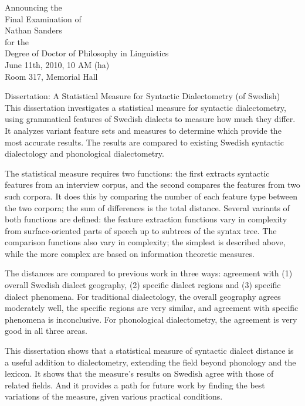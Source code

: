 \documentclass[11pt]{article}
\begin{document}
\begin{center}
Announcing the\\
Final Examination of \\
Nathan Sanders \\
for the \\
Degree of Doctor of Philosophy in Linguistics \\
June 11th, 2010, 10 AM (ha) \\
Room 317, Memorial Hall
\end{center}

Dissertation: A Statistical Measure for Syntactic Dialectometry (of Swedish) \\

This dissertation investigates a statistical measure for syntactic
dialectometry, using grammatical features of Swedish dialects to
measure how much they differ. It analyzes variant feature sets and
measures to determine which provide the most accurate results. The
results are compared to existing Swedish syntactic dialectology and
phonological dialectometry.

The statistical measure requires two functions: the first extracts
syntactic features from an interview corpus, and the second compares
the features from two such corpora. It does this by comparing the
number of each feature type between the two corpora; the sum of
differences is the total distance. Several variants of both functions
are defined: the feature extraction functions vary in complexity from
surface-oriented parts of speech up to subtrees of the syntax
tree. The comparison functions also vary in complexity; the simplest
is described above, while the more complex are based on information
theoretic measures.

The distances are compared to previous work in three ways: agreement
with (1) overall Swedish dialect geography, (2) specific dialect
regions and (3) specific dialect phenomena. For traditional
dialectology, the overall geography agrees moderately well, the
specific regions are very similar, and agreement with specific
phenomena is inconclusive. For phonological dialectometry, the
agreement is very good in all three areas.

This dissertation shows that a statistical measure of syntactic
dialect distance is a useful addition to dialectometry, extending the
field beyond phonology and the lexicon. It shows that the measure's
results on Swedish agree with those of related fields. And it provides
a path for future work by finding the best variations of the
measure, given various practical conditions.
\end{document}
